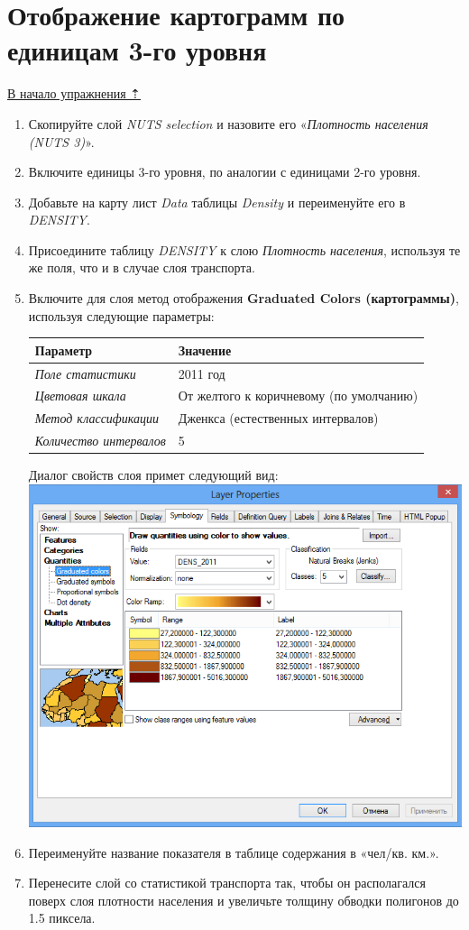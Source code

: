 \documentclass[12pt,]{book}
\begin{document}
\hypertarget{stat-map-economic-choropleths3}{%
\section{Отображение картограмм по единицам 3-го уровня}\label{stat-map-economic-choropleths3}}

\protect\hyperlink{stat-map-economic}{В начало упражнения ⇡}

\begin{enumerate}
\def\labelenumi{\arabic{enumi}.}
\item
  Скопируйте слой \emph{NUTS selection} и назовите его «\emph{Плотность населения (NUTS 3)}».
\item
  Включите единицы 3-го уровня, по аналогии с единицами 2-го уровня.
\item
  Добавьте на карту лист \emph{Data} таблицы \emph{Density} и переименуйте его в \emph{DENSITY}.
\item
  Присоедините таблицу \emph{DENSITY} к слою \emph{Плотность населения}, используя те же поля, что и в случае слоя транспорта.
\item
  Включите для слоя метод отображения \textbf{Graduated Colors (картограммы)}, используя следующие параметры:

  \begin{longtable}[]{@{}ll@{}}
  \toprule
  Параметр & Значение\tabularnewline
  \midrule
  \endhead
  \emph{Поле статистики} & 2011 год\tabularnewline
  \emph{Цветовая шкала} & От желтого к коричневому (по умолчанию)\tabularnewline
  \emph{Метод классификации} & Дженкса (естественных интервалов)\tabularnewline
  \emph{Количество интервалов} & 5\tabularnewline
  \bottomrule
  \end{longtable}

  Диалог свойств слоя примет следующий вид:
  \includegraphics{images/Ex08/image26.png}
\item
  Переименуйте название показателя в таблице содержания в «чел/кв. км.».
\item
  Перенесите слой со статистикой транспорта так, чтобы он располагался поверх слоя плотности населения и увеличьте толщину обводки полигонов до 1.5 пиксела.
\end{enumerate}
\end{document}
